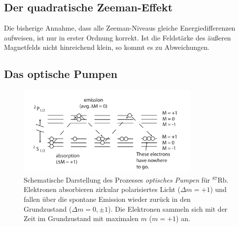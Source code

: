 \subsection{Der quadratische Zeeman-Effekt}
Die bisherige Annahme, dass alle Zeeman-Niveaus gleiche Energiedifferenzen aufweisen, ist nur in erster Ordnung korrekt.
Ist die Feldstärke des äußeren Magnetfelds nicht hinreichend klein, so kommt es zu Abweichungen.



\subsection{Das optische Pumpen}
\begin{figure}
    \centering
    \includegraphics[width=0.8\textwidth]{content/img/optisches_pumpen.png}
    \caption{Schematische Darstellung des Prozesses \textit{optisches Pumpen} für $^{87}\text{Rb}$.
    Elektronen absorbieren zirkular polarisiertes Licht ($\Delta m = +1$) und 
    fallen über die spontane Emission wieder zurück in den Grundzustand ($\Delta m = 0, \pm 1$).
    Die Elektronen sammeln sich mit der Zeit im Grundzustand mit maximalen $m$ ($m=+1$) an.
    }
    \label{fig:optisches_pumpen}
\end{figure}